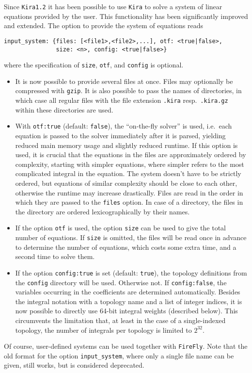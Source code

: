 \documentclass[11pt,a4paper,DIV=11,numbers=noenddot,parskip=half]{scrartcl}
\newcommand{\code}[1]{\texttt{#1}}
\newcommand*{\kira}{\code{Kira}}
\newcommand*{\firefly}{\code{FireFly}}
\begin{document}
Since \kira{}\;\code{1.2} it has been possible to use \kira{} to solve a system
of linear equations provided by the user.
This functionality has been significantly improved and extended.
The option to provide the system of equations reads
%
\begin{verbatim}
input_system: {files: [<file1>,<file2>,...], otf: <true|false>,
               size: <n>, config: <true|false>}
\end{verbatim}
%
where the specification of \code{size}, \code{otf}, and \code{config} is optional.
\begin{itemize}
  \item It is now possible to provide several files at once.
    Files may optionally be compressed with \code{gzip}.
    It is also possible to pass the names of directories, in which case all
    regular files with the file extension \code{.kira} resp.\ \code{.kira.gz}
    within these directories are used.
  \item With \code{otf:\;true} (default: \code{false}), the
    ``on-the-fly solver'' is used, i.e.\ each equation is passed to the solver
    immediately after it is parsed, yielding reduced main memory usage
    and slightly reduced runtime.
    If this option is used, it is crucial that the equations in the files are
    approximately ordered by complexity, starting with simpler equations, where
    simpler refers to the most complicated integral in the equation.
    The system doesn't have to be strictly ordered, but equations of similar
    complexity should be close to each other, otherwise the runtime may increase
    drastically.
    Files are read in the order in which they are passed to the \code{files}
    option.
    In case of a directory, the files in the directory are ordered
    lexicographically by their names.
  \item If the option \code{otf} is used, the option \code{size} can be used
    to give the total number of equations.
    If \code{size} is omitted, the files will be read once in advance to
    determine the number of equations, which costs some extra time,
    and a second time to solve them.
  \item If the option \code{config:\;true} is set (default: \code{true}),
    the topology definitions from the \code{config} directory will be used.
    Otherwise not.
    If \code{config:\;false}, the variables occurring in the coefficients are
    determined automatically.
    Besides the integral notation with a topology name and a list of integer
    indices, it is now possible to directly use 64-bit integral weights
    (described below).
    This circumvents the limitation that, at least in the case of a
    single-indexed topology, the number of integrals per topology is limited
    to $2^{32}$.
\end{itemize}
Of course, user-defined systems can be used together with \firefly{}.
Note that the old format for the option \code{input\_system}, where only a single file name can be given, still works, but is considered deprecated.
\end{document}
